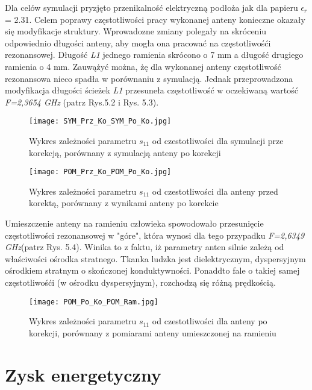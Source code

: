 \newpage
Dla celów symulacji pryzjęto przenikalność elektryczną podłoża jak dla papieru $\epsilon_{r}$ = 2.31. Celem poprawy częstotliwości pracy wykonanej anteny konieczne okazały się modyfikacje struktury. Wprowadozne zmiany polegały na skróceniu odpowiednio długości anteny, aby mogła ona pracować na częstotliwośći rezonansowej. Długość \emph{L1} jednego ramienia skrócono o 7 mm a długość drugiego ramienia o 4 mm. Zauwążyć można, żę dla wykonanej anteny częstotliwość rezonansowa nieco spadła w porównaniu z symulacją. Jednak przeprowadzona modyfikacja długości ścieżek \emph{L1} przesuneła częstotliwość w oczekiwaną wartość \emph{F=2,3654 GHz} (patrz Rys.5.2 i Rys. 5.3).  

\begin{figure}[h!]
\centering
	\texttt{[image: SYM\_Prz\_Ko\_SYM\_Po\_Ko.jpg]}
	\caption{Wykres zależności parametru $s_{11}$ od czestotliwości dla symulacji prze korekcją, porównany z symulacją anteny po korekcji}
\end{figure}


\begin{figure}[h!]
\centering
	\texttt{[image: POM\_Prz\_Ko\_POM\_Po\_Ko.jpg]}
	\caption{Wykres zależności parametru $s_{11}$ od czestotliwości dla anteny przed korektą, porównany z wynikami anteny po korekcie}
\end{figure}


\newpage
\noindent
\newline Umieszczenie anteny na ramieniu człowieka spowodowało przesunięcie częstotliwości rezonansowej w "góre", która wynosi dla tego przypadku \emph{F=2,6349 GHz}(patrz Rys. 5.4). Winika to z faktu, iż parametry anten silnie zależą od właściwości ośrodka stratnego.  
Tkanka ludzka jest dielektrycznym, dyspersyjnym ośrodkiem stratnym o skończonej konduktywności. Ponaddto fale o takiej samej częstotliwośći (w ośrodku dyspersyjnym), rozchodzą się różną prędkością. 

\begin{figure}[h!]
\centering
	\texttt{[image: POM\_Po\_Ko\_POM\_Ram.jpg]}
	\caption{Wykres zależności parametru $s_{11}$ od czestotliwości dla anteny po korekcji, porównany z pomiarami anteny umieszczonej na ramieniu}
\end{figure}


\newpage

\section{Zysk energetyczny}

